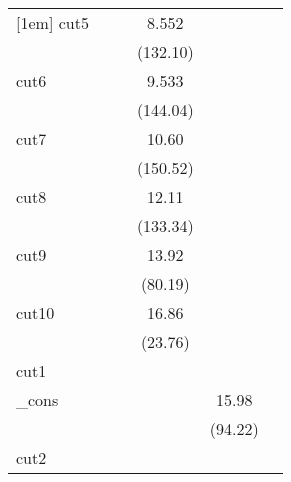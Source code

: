 {\begin{tabular}{l*{5}{c}}
[1em]
cut5        &                     &                     &       8.552\sym{***}&                     &                     \\
            &                     &                     &    (132.10)         &                     &                     \\
[1em]
cut6        &                     &                     &       9.533\sym{***}&                     &                     \\
            &                     &                     &    (144.04)         &                     &                     \\
[1em]
cut7        &                     &                     &       10.60\sym{***}&                     &                     \\
            &                     &                     &    (150.52)         &                     &                     \\
[1em]
cut8        &                     &                     &       12.11\sym{***}&                     &                     \\
            &                     &                     &    (133.34)         &                     &                     \\
[1em]
cut9        &                     &                     &       13.92\sym{***}&                     &                     \\
            &                     &                     &     (80.19)         &                     &                     \\
[1em]
cut10       &                     &                     &       16.86\sym{***}&                     &                     \\
            &                     &                     &     (23.76)         &                     &                     \\
\hline
cut1        &                     &                     &                     &                     &                     \\
\_cons      &                     &                     &                     &       15.98\sym{***}&                     \\
            &                     &                     &                     &     (94.22)         &                     \\
\hline
cut2        &                     &                     &                     &                     &                     \\

\end{tabular}}
